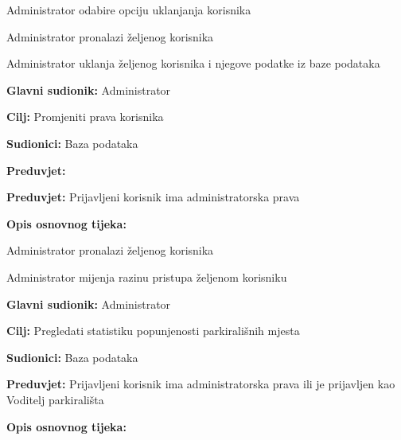\begin{packed_item}
\begin{packed_item}
\begin{packed_item}
						\item[] \begin{packed_enum}
	
							\item Administrator odabire opciju uklanjanja korisnika
							\item Administrator pronalazi željenog korisnika
							\item Administrator uklanja željenog korisnika i njegove podatke iz baze podataka
							
						\end{packed_enum}

					\end{packed_item}

                        \noindent {}
					\begin{packed_item}
	
						\item \textbf{Glavni sudionik: }Administrator
						\item  \textbf{Cilj:} Promjeniti prava korisnika
						\item  \textbf{Sudionici:} Baza podataka
						\item  \textbf{Preduvjet:} 						\item  \textbf{Preduvjet:} Prijavljeni korisnik ima administratorska prava
						\item  \textbf{Opis osnovnog tijeka:}
						
						\item[] \begin{packed_enum}
	
							\item Administrator pronalazi željenog korisnika
							\item Administrator mijenja razinu pristupa željenom korisniku
							
							
						\end{packed_enum}

					\end{packed_item}

                        \noindent {}
					\begin{packed_item}
	
						\item \textbf{Glavni sudionik: }Administrator
						\item  \textbf{Cilj:} Pregledati statistiku popunjenosti parkirališnih mjesta
						\item  \textbf{Sudionici:} Baza podataka
						\item  \textbf{Preduvjet:} Prijavljeni korisnik ima administratorska prava ili je prijavljen kao Voditelj parkirališta
						\item  \textbf{Opis osnovnog tijeka:}
						

\end{packed_item}
\end{packed_item}
\end{packed_item}
